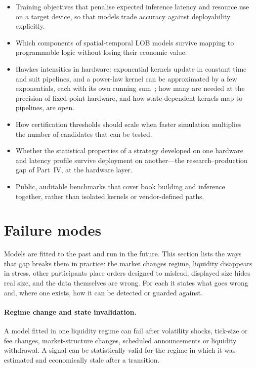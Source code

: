 \begin{itemize}[leftmargin=1.5em,itemsep=1pt]
\item Training objectives that penalise expected inference latency and resource use on a target
  device, so that models trade accuracy against deployability explicitly.
\item Which components of spatial-temporal LOB models survive mapping to programmable logic without
  losing their economic value.
\item Hawkes intensities in hardware: exponential kernels update in constant time and suit pipelines,
  and a power-law kernel can be approximated by a few exponentials, each with its own running
  sum~\citep{bochud2007}; how many are needed at the precision of fixed-point hardware, and how
  state-dependent kernels map to pipelines, are open.
\item How certification thresholds should scale when faster simulation multiplies the number of
  candidates that can be tested.
\item Whether the statistical properties of a strategy developed on one hardware and latency profile
  survive deployment on another---the research--production gap of Part~IV, at the hardware layer.
\item Public, auditable benchmarks that cover book building and inference together, rather than
  isolated kernels or vendor-defined paths.
\end{itemize}

\section{Failure modes}
\label{sec:failures}

Models are fitted to the past and run in the future. This section lists the ways that gap breaks
them in practice: the market changes regime, liquidity disappears in stress, other participants place
orders designed to mislead, displayed size hides real size, and the data themselves are wrong. For each
it states what goes wrong and, where one exists, how it can be detected or guarded against.

\paragraph{Regime change and state invalidation.} A model fitted in one liquidity regime can
fail after volatility shocks, tick-size or fee changes, market-structure changes, scheduled
announcements or liquidity withdrawal. A signal can be statistically valid for the regime in which
it was estimated and economically stale after a transition.

